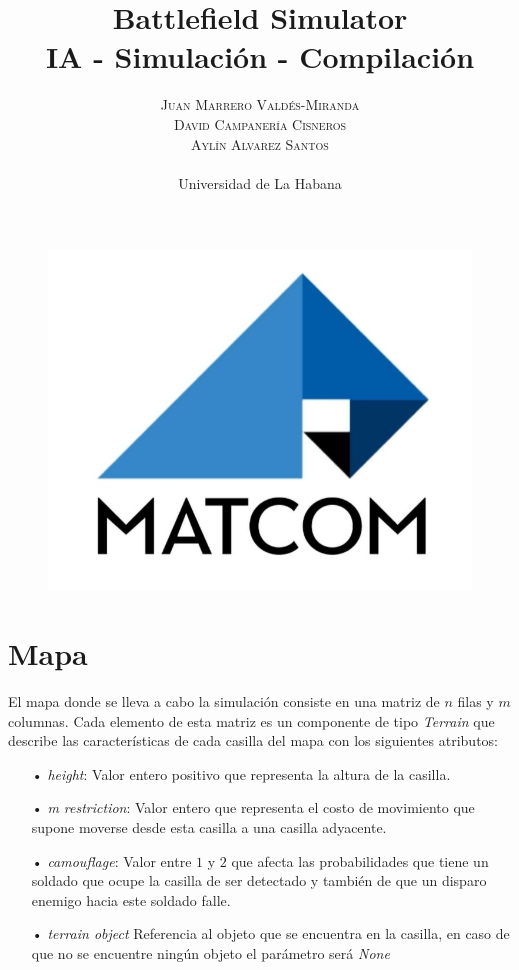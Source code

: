 \documentclass[twoside]{article}
\title{
		{\Huge Battlefield Simulator}
		\\
		{\Large IA - Simulación - Compilación}
	} %
\author{
		\large
		\textsc{Juan Marrero Vald\'es-Miranda}\\ \textsc{David Campanería Cisneros}\\ \textsc{Ayl\'in Alvarez Santos}\\ \\ %
		\normalsize Universidad de La Habana \\ %
		\normalsize 
		\vspace{-5mm}
	}
\date{}
\begin{document}
		
		\maketitle %
		
		\thispagestyle{fancy} %
		\vspace{5cm}
		\begin{figure}
			\centering
			\includegraphics[scale=0.3]{logo-matcom}
		\end{figure}
		\vspace{5cm}
		\newpage
		\tableofcontents
		\newpage
		
\section{Mapa}

El mapa donde se lleva a cabo la simulaci\'on consiste en una matriz de $n$ filas y $m$ columnas. Cada elemento de esta matriz es un componente de tipo \emph{Terrain} que describe las caracter\'isticas de cada casilla del mapa con los siguientes atributos:\\

\begin{itemize}
	\item[•] \emph{height}: Valor entero positivo que representa la altura de la casilla.
	\item[•] \emph{m restriction}: Valor entero que representa el costo de movimiento que supone moverse desde esta casilla a una casilla adyacente.
	\item[•] \emph{camouflage}: Valor entre $1$ y $2$ que afecta las probabilidades que tiene un soldado que ocupe la casilla de ser detectado y tambi\'en de que un disparo enemigo hacia este soldado falle.
	\item[•] \emph{terrain object} Referencia al objeto que se encuentra en la casilla, en caso de que no se encuentre ning\'un objeto el par\'ametro ser\'a \emph{None}
	
\end{itemize}
\end{document}
